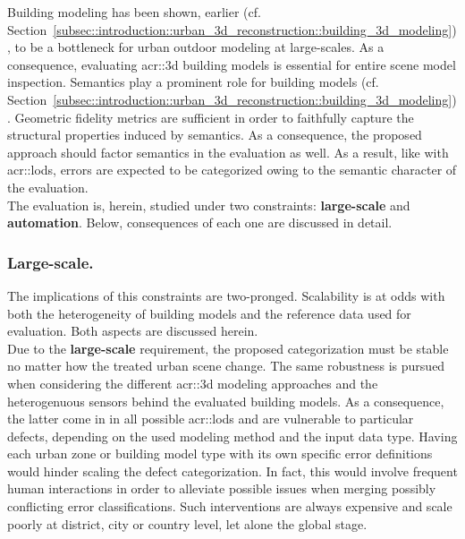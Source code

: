        Building modeling has been shown, earlier (cf. Section~\ref{subsec::introduction::urban_3d_reconstruction::building_3d_modeling}), to be a bottleneck for urban outdoor modeling at large-scales.
        As a consequence, evaluating \gls{acr::3d} building models is essential for entire scene model inspection.
        Semantics play a prominent role for building models (cf. Section~\ref{subsec::introduction::urban_3d_reconstruction::building_3d_modeling}).
        Geometric fidelity metrics are sufficient in order to faithfully capture the structural properties induced by semantics.
        As a consequence, the proposed approach should factor semantics in the evaluation as well.
        As a result, like with \glspl{acr::lod}, errors are expected to be categorized owing to the semantic character of the evaluation.\\

        The evaluation is, herein, studied under two constraints: \textbf{large-scale} and \textbf{automation}.
        Below, consequences of each one are discussed in detail.
        \subsubsection{Large-scale.}
            The implications of this constraints are two-pronged.
            Scalability is at odds with both the heterogeneity of building models and the reference data used for evaluation.
            Both aspects are discussed herein.\\

            Due to the \textbf{large-scale} requirement, the proposed categorization must be stable no matter how the treated urban scene change.
            The same robustness is pursued when considering the different \gls{acr::3d} modeling approaches and the heterogenuous sensors behind the evaluated building models.
            As a consequence, the latter come in in all possible \glspl{acr::lod} and are vulnerable to particular defects, depending on the used modeling method and the input data type.
            Having each urban zone or building model type with its own specific error definitions would hinder scaling the defect categorization.
            In fact, this would involve frequent human interactions in order to alleviate possible issues when merging possibly conflicting error classifications.
            Such interventions are always expensive and scale poorly at district, city or country level, let alone the global stage.\\

